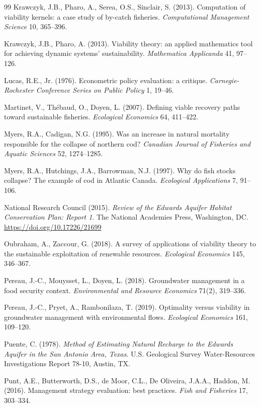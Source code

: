 \documentclass[11pt,a4paper]{article}
\theoremstyle{plain}
\theoremstyle{definition}
\theoremstyle{remark}
\begin{document}
\begin{thebibliography}{99}
 Krawczyk, J.B., Pharo, A., Serea, O.S., Sinclair, S. (2013). Computation of viability kernels: a case study of by-catch fisheries. \emph{Computational Management Science} 10, 365--396.

 Krawczyk, J.B., Pharo, A. (2013). Viability theory: an applied mathematics tool for achieving dynamic systems' sustainability. \emph{Mathematica Applicanda} 41, 97--126.

 Lucas, R.E., Jr. (1976). Econometric policy evaluation: a critique. \emph{Carnegie-Rochester Conference Series on Public Policy} 1, 19--46.

 Martinet, V., Th\'ebaud, O., Doyen, L. (2007). Defining viable recovery paths toward sustainable fisheries. \emph{Ecological Economics} 64, 411--422.

 Myers, R.A., Cadigan, N.G. (1995). Was an increase in natural mortality responsible for the collapse of northern cod? \emph{Canadian Journal of Fisheries and Aquatic Sciences} 52, 1274--1285.

 Myers, R.A., Hutchings, J.A., Barrowman, N.J. (1997). Why do fish stocks collapse? The example of cod in Atlantic Canada. \emph{Ecological Applications} 7, 91--106.

 National Research Council (2015). \emph{Review of the Edwards Aquifer Habitat Conservation Plan: Report 1}. The National Academies Press, Washington, DC. \url{https://doi.org/10.17226/21699}

 Oubraham, A., Zaccour, G. (2018). A survey of applications of viability theory to the sustainable exploitation of renewable resources. \emph{Ecological Economics} 145, 346--367.

 Pereau, J.-C., Mouysset, L., Doyen, L. (2018). Groundwater management in a food security context. \emph{Environmental and Resource Economics} 71(2), 319--336.

 Pereau, J.-C., Pryet, A., Rambonilaza, T. (2019). Optimality versus viability in groundwater management with environmental flows. \emph{Ecological Economics} 161, 109--120.

 Puente, C. (1978). \emph{Method of Estimating Natural Recharge to the Edwards Aquifer in the San Antonio Area, Texas}. U.S. Geological Survey Water-Resources Investigations Report 78-10, Austin, TX.

 Punt, A.E., Butterworth, D.S., de Moor, C.L., De Oliveira, J.A.A., Haddon, M. (2016). Management strategy evaluation: best practices. \emph{Fish and Fisheries} 17, 303--334.


\end{thebibliography}
\end{document}
